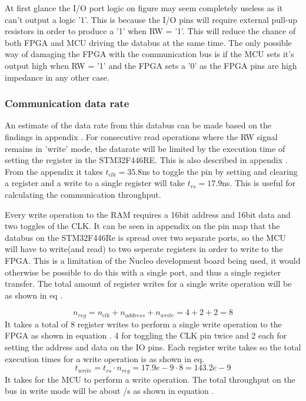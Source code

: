 At first glance the I/O port logic on figure  may seem completely useless as it can't output a logic '1'. This is because the I/O pins will require external pull-up resistors in order to produce a '1' when RW = '1'. This will reduce the chance of both FPGA and MCU driving the databus at the same time. The only possible way of damaging the FPGA with the communication bus is if the MCU sets it's output high when RW = '1' and the FPGA sets a '0' as the FPGA pins are high impedance in any other case.

\subsubsection{Communication data rate} \label{subsubsec:CommunicationDatarate}

An estimate of the data rate from this databus can be made based on the findings in appendix . For consecutive read operations where the RW signal remains in 'write' mode, the datarate will be limited by the execution time of setting the register in the STM32F446RE. This is also described in appendix . From the appendix it takes $t_{clk} = 35.8$ns to toggle the pin by setting and clearing a register and a write to a single register will take $t_{rs} = 17.9$ns. This is useful for calculating the communication throughput.

Every write operation to the RAM requires a 16bit address and 16bit data and two toggles of the CLK. It can be seen in appendix  on the pin map that the databus on the STM32F446Re is spread over two separate ports, so the MCU will have to write(and read) to two seperate registers in order to write to the FPGA. This is a limitation of the Nucleo development board being used, it would otherwise be possible to do this with a single port, and thus a single register transfer. The total amount of register writes for a single write operation will be as shown in eq .

\begin{equation}\label{eq:7_2_1_Write_ThroughPut}
    n_{reg} = n_{clk} +  n_{address} + n_{write} = 4+2+2 = 8 
\end{equation}
It takes a total of 8 register writes to perform a single write operation to the FPGA as shown in equation . 4 for toggling the CLK pin twice and 2 each for setting the address and data on the IO pins. Each register write takes  so the total execution times for a write operation is  as shown in eq.
\begin{equation}\label{eq:7_2_1_Write_ThroughPutTotalTime}
    t_{write} = t_{rs} \cdot n_{reg} = 17.9e-9 \cdot 8 =  143.2e-9
\end{equation}
It takes  for the MCU to perform a write operation. The total throughput on the bus in write mode will be about /s as shown in equation .


